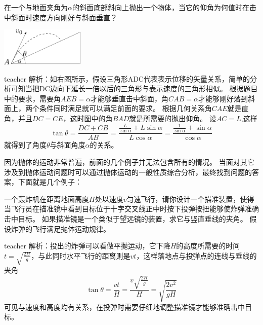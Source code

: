 \begin{example}
在一个与地面夹角为$\alpha$的斜面底部斜向上抛出一个物体，当它的仰角为何值时在击中斜面时速度方向刚好与斜面垂直？
\begin{flushright}
\includegraphics[width = 0.3\textwidth]{images/motion-12.pdf} 
\end{flushright}
\begin{taggedblock}{teacher}
\noindent
解析：如右图所示，假设三角形ADC代表表示位移的矢量关系，简单的分析可知当把DC边向下延长一倍以后的三角形与表示速度的三角形相似。
根据题目中的要求，需要角$AEB = \alpha$才能够垂直击中斜面，角$CAB = \alpha$才能够刚好落到斜面上，两个条件同时满足就可以满足前面的要求。
根据几何关系角$CAE$就是直角，并且$DC=CE$，这时图中的角$BAD$就是所需要的抛出仰角。
设$AC=L$,这样
\[
\tan\theta  = \frac{DC+CB}{AB} = \frac{\frac{L}{\sin\alpha}+L\sin\alpha}{L\cos\alpha} = \frac{\frac{1}{\sin\alpha}+\sin\alpha}{\cos\alpha}
\]
就得到了角度$\theta$与斜面角度$\alpha$的关系。

\end{taggedblock}
\end{example}

因为抛体的运动非常普遍，前面的几个例子并无法包含所有的情况。
当面对其它涉及到抛体运动问题时可以通过抛体运动的一般性质综合分析，最终找到问题的答案，下面就是几个例子：

\begin{example}
一个轰炸机在距离地面高度$H$处以速度$v$匀速飞行，请你设计一个描准装置，使得当飞行员在描准镜中看到目标位于十字交叉线正中时按下投弹按扭能够使炸弹准确击中目标。
如果描准镜是一个类似于望远镜的装置，求它与竖直垂线的夹角。
假设炸弹的飞行满足抛体运动规律。
\begin{taggedblock}{teacher}
\newline
解析：投出的炸弹可以看做平抛运动，它下降$H$的高度所需要的时间$t=\sqrt{\frac{2H}{g}}$，与此同时水平飞行的距离则是$vt$，这样落地点与投弹点的连线与垂线的夹角
\[
\tan\theta = \frac{vt}{H} = \frac{v\sqrt{\frac{2H}{g}}}{H} = \sqrt{\frac{2v^2}{gH}}
\]
可见与速度和高度均有关系，在投弹时需要仔细地调整描准镜才能够准确击中目标。
\end{taggedblock}
\end{example}


